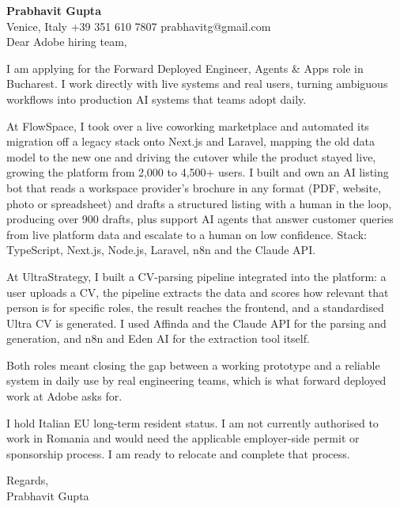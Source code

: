 \documentclass[a4paper,10.5pt]{article}
\begin{document}
\textbf{Prabhavit Gupta}\\
Venice, Italy \textbar{} +39 351 610 7807 \textbar{} prabhavitg@gmail.com\\[10pt]
Dear Adobe hiring team,

I am applying for the Forward Deployed Engineer, Agents \& Apps role in Bucharest. I work directly with live systems and real users, turning ambiguous workflows into production AI systems that teams adopt daily.

At FlowSpace, I took over a live coworking marketplace and automated its migration off a legacy stack onto Next.js and Laravel, mapping the old data model to the new one and driving the cutover while the product stayed live, growing the platform from 2,000 to 4,500+ users. I built and own an AI listing bot that reads a workspace provider's brochure in any format (PDF, website, photo or spreadsheet) and drafts a structured listing with a human in the loop, producing over 900 drafts, plus support AI agents that answer customer queries from live platform data and escalate to a human on low confidence. Stack: TypeScript, Next.js, Node.js, Laravel, n8n and the Claude API.

At UltraStrategy, I built a CV-parsing pipeline integrated into the platform: a user uploads a CV, the pipeline extracts the data and scores how relevant that person is for specific roles, the result reaches the frontend, and a standardised Ultra CV is generated. I used Affinda and the Claude API for the parsing and generation, and n8n and Eden AI for the extraction tool itself.

Both roles meant closing the gap between a working prototype and a reliable system in daily use by real engineering teams, which is what forward deployed work at Adobe asks for.

I hold Italian EU long-term resident status. I am not currently authorised to work in Romania and would need the applicable employer-side permit or sponsorship process. I am ready to relocate and complete that process.

Regards,\\
Prabhavit Gupta
\end{document}
